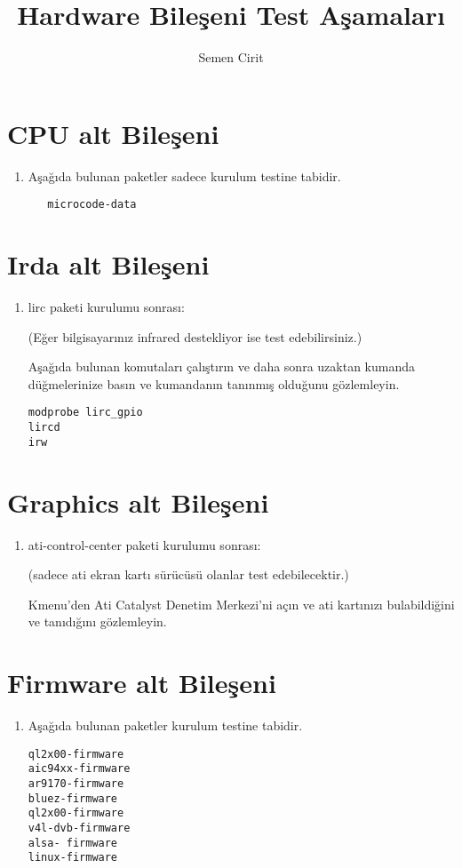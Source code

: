 \documentclass[a4paper,10pt]{article}
\title{Hardware Bileşeni Test Aşamaları}
\author{Semen Cirit}
\begin{document}
\maketitle
\section{CPU alt Bileşeni}
\begin{enumerate}
 \item Aşağıda bulunan paketler sadece kurulum testine tabidir.
  \begin{verbatim}
   microcode-data
  \end{verbatim}

\end{enumerate}

\section{Irda alt Bileşeni}
\begin{enumerate}
 \item lirc paketi kurulumu sonrası:

(Eğer bilgisayarınız infrared destekliyor ise test edebilirsiniz.)

Aşağıda bulunan komutaları çalıştırın ve daha sonra uzaktan kumanda düğmelerinize basın ve kumandanın tanınmış olduğunu gözlemleyin.
\begin{verbatim}
modprobe lirc_gpio
lircd
irw  
\end{verbatim}

\end{enumerate}


\section{Graphics alt Bileşeni}
\begin{enumerate}
 \item ati-control-center paketi kurulumu sonrası:

(sadece ati ekran kartı sürücüsü olanlar test edebilecektir.)
 
Kmenu'den Ati Catalyst Denetim Merkezi'ni açın ve ati kartınızı bulabildiğini ve tanıdığını gözlemleyin.
\end{enumerate}

\section{Firmware alt Bileşeni}
\begin{enumerate}
 \item Aşağıda bulunan paketler kurulum testine tabidir.
\begin{verbatim}
ql2x00-firmware
aic94xx-firmware
ar9170-firmware
bluez-firmware
ql2x00-firmware
v4l-dvb-firmware
alsa- firmware
linux-firmware
\end{verbatim}
\end{enumerate}
\end{document}
